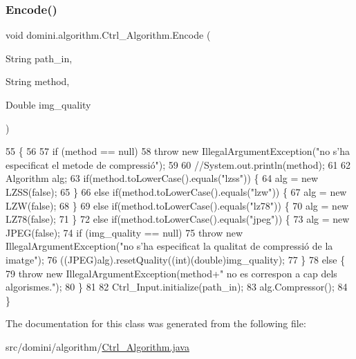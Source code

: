 \subsubsection{\texorpdfstring{Encode()}{Encode()}}
{\footnotesize\ttfamily void domini.\+algorithm.\+Ctrl\+\_\+\+Algorithm.\+Encode (\begin{DoxyParamCaption}\item[{String}]{path\+\_\+in,  }\item[{String}]{method,  }\item[{Double}]{img\+\_\+quality }\end{DoxyParamCaption})\hspace{0.3cm}{\ttfamily [inline]}}


\begin{DoxyCode}
55                                                                           \{
56         
57         \textcolor{keywordflow}{if} (method == null)
58             \textcolor{keywordflow}{throw} \textcolor{keyword}{new} IllegalArgumentException(\textcolor{stringliteral}{"no s'ha especificat el metode de compressió"});
59 
60         \textcolor{comment}{//System.out.println(method);}
61 
62         Algorithm alg;
63         \textcolor{keywordflow}{if}(method.toLowerCase().equals(\textcolor{stringliteral}{"lzss"})) \{
64             alg = \textcolor{keyword}{new} LZSS(\textcolor{keyword}{false});
65         \}
66         \textcolor{keywordflow}{else} \textcolor{keywordflow}{if}(method.toLowerCase().equals(\textcolor{stringliteral}{"lzw"})) \{
67             alg = \textcolor{keyword}{new} LZW(\textcolor{keyword}{false});
68         \}
69         \textcolor{keywordflow}{else} \textcolor{keywordflow}{if}(method.toLowerCase().equals(\textcolor{stringliteral}{"lz78"})) \{
70             alg = \textcolor{keyword}{new} LZ78(\textcolor{keyword}{false});
71         \}
72         \textcolor{keywordflow}{else} \textcolor{keywordflow}{if}(method.toLowerCase().equals(\textcolor{stringliteral}{"jpeg"})) \{
73             alg = \textcolor{keyword}{new} JPEG(\textcolor{keyword}{false});
74             \textcolor{keywordflow}{if} (img\_quality == null) 
75                 \textcolor{keywordflow}{throw} \textcolor{keyword}{new} IllegalArgumentException(\textcolor{stringliteral}{"no s'ha especificat la qualitat de compressió de la
       imatge"});
76             ((JPEG)alg).resetQuality((\textcolor{keywordtype}{int})(\textcolor{keywordtype}{double})img\_quality);
77         \}
78         \textcolor{keywordflow}{else} \{
79             \textcolor{keywordflow}{throw} \textcolor{keyword}{new} IllegalArgumentException(method+\textcolor{stringliteral}{" no es correspon a cap dels algorismes."});
80         \}
81         
82         Ctrl\_Input.initialize(path\_in);
83         alg.Compressor();
84     \}
\end{DoxyCode}


The documentation for this class was generated from the following file\+:\begin{DoxyCompactItemize}
\item 
src/domini/algorithm/\hyperlink{Ctrl__Algorithm_8java}{Ctrl\+\_\+\+Algorithm.\+java}\end{DoxyCompactItemize}
